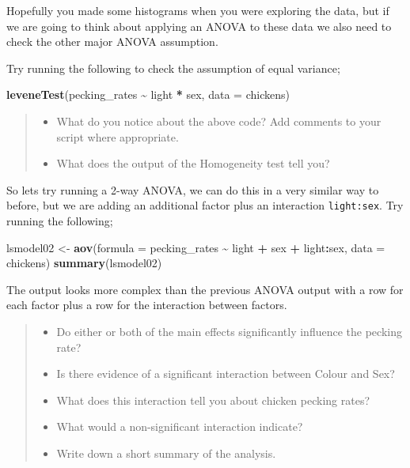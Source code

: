 \documentclass[
]{book}
\newenvironment{Shaded}{\begin{snugshade}}{\end{snugshade}}
\newcommand{\AttributeTok}[1]{\textcolor[rgb]{0.13,0.29,0.53}{#1}}
\newcommand{\FunctionTok}[1]{\textcolor[rgb]{0.13,0.29,0.53}{\textbf{#1}}}
\newcommand{\NormalTok}[1]{#1}
\newcommand{\OtherTok}[1]{\textcolor[rgb]{0.56,0.35,0.01}{#1}}
\newcommand{\SpecialCharTok}[1]{\textcolor[rgb]{0.81,0.36,0.00}{\textbf{#1}}}
\providecommand{\tightlist}{%
  \setlength{\itemsep}{0pt}\setlength{\parskip}{0pt}}
\begin{document}
Hopefully you made some histograms when you were exploring the data, but if we are going to think about applying an ANOVA to these data we also need to check the other major ANOVA assumption.

Try running the following to check the assumption of equal variance;

\begin{Shaded}
\begin{Highlighting}[]
\FunctionTok{leveneTest}\NormalTok{(pecking\_rates }\SpecialCharTok{\textasciitilde{}}\NormalTok{ light }\SpecialCharTok{*}\NormalTok{ sex, }\AttributeTok{data =}\NormalTok{ chickens)}
\end{Highlighting}
\end{Shaded}

\begin{quote}
\begin{itemize}
\tightlist
\item
  What do you notice about the above code? Add comments to your script where appropriate.
\item
  What does the output of the Homogeneity test tell you?
\end{itemize}
\end{quote}

So lets try running a 2-way ANOVA, we can do this in a very similar way to before, but we are adding an additional factor plus an interaction \texttt{light:sex}. Try running the following;

\begin{Shaded}
\begin{Highlighting}[]
\NormalTok{lsmodel02 }\OtherTok{\textless{}{-}} \FunctionTok{aov}\NormalTok{(}\AttributeTok{formula =}\NormalTok{ pecking\_rates }\SpecialCharTok{\textasciitilde{}}\NormalTok{ light }\SpecialCharTok{+}\NormalTok{ sex }\SpecialCharTok{+}\NormalTok{ light}\SpecialCharTok{:}\NormalTok{sex, }\AttributeTok{data =}\NormalTok{ chickens)}
\FunctionTok{summary}\NormalTok{(lsmodel02)}
\end{Highlighting}
\end{Shaded}

The output looks more complex than the previous ANOVA output with a row for each factor plus a row for the interaction between factors.

\begin{quote}
\begin{itemize}
\tightlist
\item
  Do either or both of the main effects significantly influence the pecking rate?
\item
  Is there evidence of a significant interaction between Colour and Sex?
\item
  What does this interaction tell you about chicken pecking rates?
\item
  What would a non-significant interaction indicate?
\item
  Write down a short summary of the analysis.
\end{itemize}
\end{quote}
\end{document}
